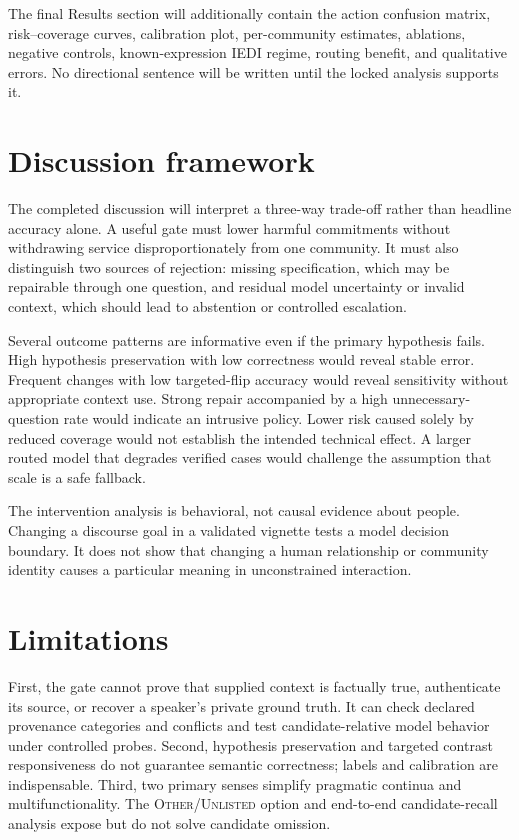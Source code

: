 \documentclass[preprint,12pt,authoryear]{elsarticle}
\begin{document}
The final Results section will additionally contain the action confusion
matrix, risk--coverage curves, calibration plot, per-community estimates,
ablations, negative controls, known-expression IEDI regime, routing benefit,
and qualitative errors. No directional sentence will be written until the
locked analysis supports it.

\section{Discussion framework}

The completed discussion will interpret a three-way trade-off rather than
headline accuracy alone. A useful gate must lower harmful commitments without
withdrawing service disproportionately from one community. It must also
distinguish two sources of rejection: missing specification, which may be
repairable through one question, and residual model uncertainty or invalid
context, which should lead to abstention or controlled escalation.

Several outcome patterns are informative even if the primary hypothesis
fails. High hypothesis preservation with low correctness would reveal stable error.
Frequent changes with low targeted-flip accuracy would reveal sensitivity
without appropriate context use. Strong repair accompanied by a high
unnecessary-question rate would indicate an intrusive policy. Lower risk
caused solely by reduced coverage would not establish the intended technical
effect. A larger routed model that degrades verified cases would challenge the
assumption that scale is a safe fallback.

The intervention analysis is behavioral, not causal evidence about people.
Changing a discourse goal in a validated vignette tests a model decision
boundary. It does not show that changing a human relationship or community
identity causes a particular meaning in unconstrained interaction.

\section{Limitations}

First, the gate cannot prove that supplied context is factually true,
authenticate its source, or recover a speaker's private ground truth. It can
check declared provenance categories and conflicts and test candidate-relative
model behavior under controlled probes. Second, hypothesis preservation and
targeted contrast responsiveness do not guarantee semantic correctness;
labels and calibration are indispensable.
Third, two primary senses simplify pragmatic continua and multifunctionality.
The \textsc{Other/Unlisted} option and end-to-end candidate-recall analysis
expose but do not solve candidate omission.
\end{document}
